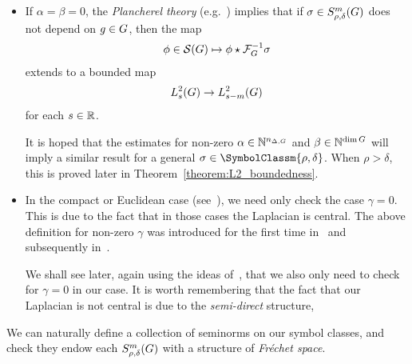 \begin{itemize}
    \item If $\alpha = \beta = 0$,
        the \emph{Plancherel theory} (e.g.~\cite[Theorem 1.8.11]{FischerRuzhansky16}) implies that
        if $\sigma \in S^{m}_{\rho, \delta}(G)$ does not depend on $g \in G$,
        then the map
        \begin{align*}
            \phi \in {\mathcal{S} (G)} \mapsto \phi \star \mathcal{F}^{-1}_{G} \sigma
        \end{align*}
        extends to a bounded map
        \begin{align*}
            L^2_{s}(G) \to L^2_{s - m}(G)
        \end{align*}
        for each $s \in \mathbb{R}$.

        It is hoped that the estimates for non-zero $\alpha \in \mathbb{N}^{n_{\Delta, G}}$ and $\beta \in \mathbb{N}^{\dim G}$
        will imply a similar result for a general $\sigma \in \SymbolClassm {\rho, \delta}$.
        When $\rho > \delta$,
        this is proved later in Theorem~\ref{theorem:L2_boundedness}.
    \item
        In the compact or Euclidean case (see~\cite{RuzhanskyTurunen10}),
        we need only check the case $\gamma = 0$.
        This is due to the fact that in those cases the Laplacian is central.
        The above definition for non-zero $\gamma$ was introduced for the first time in~\cite[Section 3.4]{FischerRuzhansky12} and subsequently in~\cite[Section 5.2]{FischerRuzhansky16}.

        We shall see later, again using the ideas of~\cite{FischerRuzhansky16},
        that we also only need to check for $\gamma = 0$ in our case.
        It is worth remembering that the fact that our Laplacian is not central
        is due to the \emph{semi-direct} structure,
\end{itemize}

We can naturally define a collection of seminorms on our symbol classes,
and check they endow each $S^{m}_{\rho, \delta}(G)$ with a structure of \emph{Fr\'echet space}.

